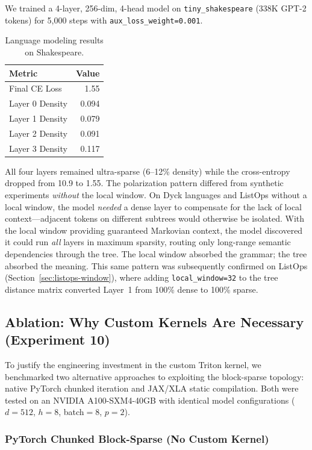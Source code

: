 \documentclass[11pt,a4paper]{article}
\begin{document}
We trained a 4-layer, 256-dim, 4-head model on \texttt{tiny\_shakespeare} (338K GPT-2 tokens) for 5,000 steps with \texttt{aux\_loss\_weight=0.001}.

\begin{table}[h]
\centering
\caption{Language modeling results on Shakespeare.}
\label{tab:language}
\begin{tabular}{@{}lr@{}}
\toprule
Metric & Value \\
\midrule
Final CE Loss & 1.55 \\
Layer 0 Density & 0.094 \\
Layer 1 Density & 0.079 \\
Layer 2 Density & 0.091 \\
Layer 3 Density & 0.117 \\
\bottomrule
\end{tabular}
\end{table}

All four layers remained ultra-sparse (6--12\% density) while the cross-entropy dropped from 10.9 to 1.55. The polarization pattern differed from synthetic experiments \emph{without} the local window. On Dyck languages and ListOps without a local window, the model \emph{needed} a dense layer to compensate for the lack of local context---adjacent tokens on different subtrees would otherwise be isolated. With the local window providing guaranteed Markovian context, the model discovered it could run \emph{all} layers in maximum sparsity, routing only long-range semantic dependencies through the tree. The local window absorbed the grammar; the tree absorbed the meaning. This same pattern was subsequently confirmed on ListOps (Section~\ref{sec:listops-window}), where adding \texttt{local\_window=32} to the tree distance matrix converted Layer~1 from 100\% dense to 100\% sparse.

\subsection{Ablation: Why Custom Kernels Are Necessary (Experiment 10)}
\label{sec:ablation}

To justify the engineering investment in the custom Triton kernel, we benchmarked two alternative approaches to exploiting the block-sparse topology: native PyTorch chunked iteration and JAX/XLA static compilation. Both were tested on an NVIDIA A100-SXM4-40GB with identical model configurations ($d=512$, $h=8$, batch$=8$, $p=2$).

\subsubsection{PyTorch Chunked Block-Sparse (No Custom Kernel)}
\end{document}
